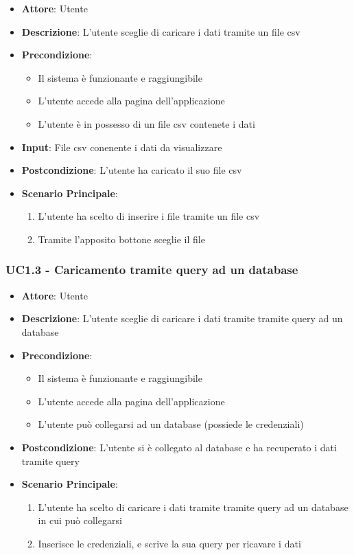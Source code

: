     \begin{itemize}
    \item \textbf{Attore}: Utente
    \item \textbf{Descrizione}: L'utente sceglie di caricare i dati tramite un file csv
    \item \textbf{Precondizione}:
    \begin{itemize}
        \item Il sistema è funzionante e raggiungibile
        \item L'utente accede alla pagina dell'applicazione
        \item L'utente è in possesso di un file csv contenete i dati
    \end{itemize}
    \item \textbf{Input}: File csv conenente i dati da visualizzare
    \item \textbf{Postcondizione}: L'utente ha caricato il suo file csv
    \item \textbf{Scenario Principale}: 
        \begin{enumerate}
            \item L'utente ha scelto di inserire i file tramite un file csv
            \item Tramite l'apposito bottone sceglie il file
        \end{enumerate}
    \end{itemize}
    
    \subsubsection{UC1.3 - Caricamento tramite query ad un database}
    \label{uc1.3}
    
    \begin{itemize}
    \item \textbf{Attore}: Utente
    \item \textbf{Descrizione}: L'utente sceglie di caricare i dati tramite tramite query ad un database
    \item \textbf{Precondizione}:
    \begin{itemize}
        \item Il sistema è funzionante e raggiungibile
        \item L'utente accede alla pagina dell'applicazione
        \item L'utente può collegarsi ad un database (possiede le credenziali)
    \end{itemize}
    \item \textbf{Postcondizione}: L'utente si è collegato al database e ha recuperato i dati tramite query
    \item \textbf{Scenario Principale}: 
        \begin{enumerate}
            \item L'utente ha scelto di caricare i dati tramite tramite query ad un database in cui può collegarsi
            \item Inserisce le credenziali, e scrive la sua query per ricavare i dati
        \end{enumerate}
    \end{itemize}
    